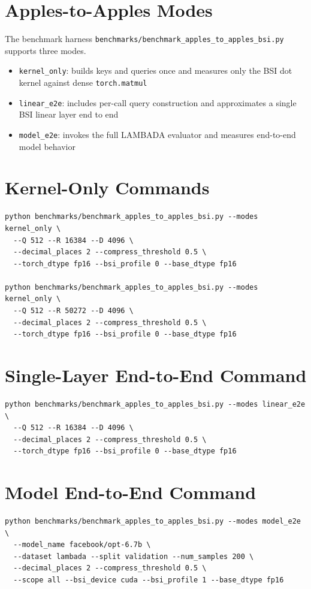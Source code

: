 \section{Apples-to-Apples Modes}
The benchmark harness \texttt{benchmarks/benchmark\_apples\_to\_apples\_bsi.py} supports three modes.

\begin{itemize}[leftmargin=2em]
\item \texttt{kernel\_only}: builds keys and queries once and measures only the BSI dot kernel against dense \texttt{torch.matmul}
\item \texttt{linear\_e2e}: includes per-call query construction and approximates a single BSI linear layer end to end
\item \texttt{model\_e2e}: invokes the full LAMBADA evaluator and measures end-to-end model behavior
\end{itemize}

\section{Kernel-Only Commands}
\begin{verbatim}
python benchmarks/benchmark_apples_to_apples_bsi.py --modes kernel_only \
  --Q 512 --R 16384 --D 4096 \
  --decimal_places 2 --compress_threshold 0.5 \
  --torch_dtype fp16 --bsi_profile 0 --base_dtype fp16

python benchmarks/benchmark_apples_to_apples_bsi.py --modes kernel_only \
  --Q 512 --R 50272 --D 4096 \
  --decimal_places 2 --compress_threshold 0.5 \
  --torch_dtype fp16 --bsi_profile 0 --base_dtype fp16
\end{verbatim}

\section{Single-Layer End-to-End Command}
\begin{verbatim}
python benchmarks/benchmark_apples_to_apples_bsi.py --modes linear_e2e \
  --Q 512 --R 16384 --D 4096 \
  --decimal_places 2 --compress_threshold 0.5 \
  --torch_dtype fp16 --bsi_profile 0 --base_dtype fp16
\end{verbatim}

\section{Model End-to-End Command}
\begin{verbatim}
python benchmarks/benchmark_apples_to_apples_bsi.py --modes model_e2e \
  --model_name facebook/opt-6.7b \
  --dataset lambada --split validation --num_samples 200 \
  --decimal_places 2 --compress_threshold 0.5 \
  --scope all --bsi_device cuda --bsi_profile 1 --base_dtype fp16
\end{verbatim}

